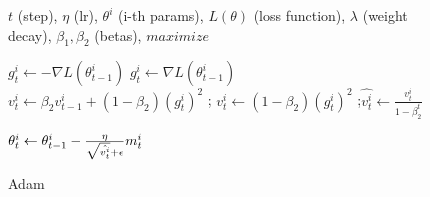 \begin{figure}[t]
\begin{algorithm}[H]
    \caption{Adam}\label{algorithm:adam}
    \begin{algorithmic}[1]
        \Require $t$ (step), $\eta$ (lr), $\theta^i$ (i-th params), $L(\theta)$ (loss function), $\lambda$ (weight decay), $\beta_1, \beta_2$ (betas),  $maximize$ 
        
        \Repeat
                \State $g^i_t \gets -\nabla L(\theta^i_{t-1})$
            \Else
                \State $g^i_t \gets \nabla L(\theta^i_{t-1})$
            \EndIf
            \State 
            \State {}
            \State {}
            \State
            \State {}
                \State $v^i_t \gets \beta_2 v^i_{t-1} + (1-\beta_2) (g^i_t)^2 $
            \Else
                \State {}; $v^i_t \gets (1-\beta_2) (g^i_t)^2 $
            \EndIf
            ;{$\hat{v^i_t} \gets \frac{v^i_t}{1-\beta_2^t}$}
            \State
            
            \State $\theta^i_t \gets \theta^i_{t-1} - \text{$ \frac{\eta}{\sqrt{\hat{v^i_t}} + \epsilon}m^i_t $} $

        \EndFor
    \end{algorithmic}
\end{algorithm}
\end{figure}

